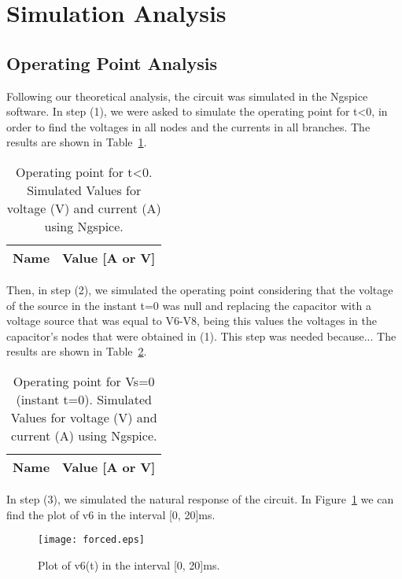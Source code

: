\section{Simulation Analysis}
\label{sec:simulation}

\subsection{Operating Point Analysis}

Following our theoretical analysis, the circuit was simulated in the Ngspice software. 
In step (1), we were asked to simulate the operating point for t<0, in order to find the voltages in all nodes and the currents in all branches. The results are shown in Table~\ref{tab:alinea1}.

\begin{table}[h]
  \centering
  \begin{tabular}{|l|r|}
    \hline    
    {\bf Name} & {\bf Value [A or V]} \\ \hline
    
  \end{tabular}
  \caption{Operating point for t<0. Simulated Values for voltage (V) and current (A) using Ngspice.}
  \label{tab:alinea1}
\end{table}

Then, in step (2), we simulated the operating point considering that the voltage of the source in the instant t=0 was null and replacing the capacitor with a voltage source that was equal to V6-V8, being this values the voltages in the capacitor's nodes that were obtained in (1). This step was needed because... The results are shown in Table~\ref{tab:alinea2}.

\begin{table}[h]
  \centering
  \begin{tabular}{|l|r|}
    \hline    
    {\bf Name} & {\bf Value [A or V]} \\ \hline
    
  \end{tabular}
  \caption{Operating point for Vs=0 (instant t=0). Simulated Values for voltage (V) and current (A) using Ngspice.}
  \label{tab:alinea2}
\end{table}

In step (3), we simulated the natural response of the circuit. In Figure~\ref{fig:plot(3)} we can find the plot of v6 in the interval [0, 20]ms.

\begin{figure}[h] \centering
\texttt{[image: forced.eps]}
\caption{Plot of v6(t) in the interval [0, 20]ms.}
\label{fig:plot(3)}
\end{figure}

